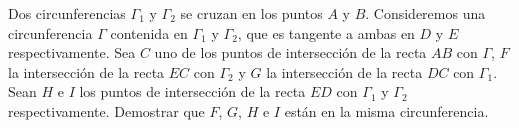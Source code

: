 Dos circunferencias $ \Gamma_1$ y $ \Gamma_2$ se cruzan en los puntos $ A$ y $ B$. Consideremos una circunferencia $ \Gamma$ contenida en $ \Gamma_1$ y $ \Gamma_2$, que es tangente a ambas en $ D$ y $ E$ respectivamente. Sea $ C$ uno de los puntos de intersección de la recta $ AB$ con $ \Gamma$, $ F$ la intersección de la recta $ EC$ con $ \Gamma_2$ y $ G$ la intersección de la recta $ DC$ con $ \Gamma_1$. Sean $ H$ e $ I$ los puntos de intersección de la recta $ ED$ con $ \Gamma_1$ y $ \Gamma_2$ respectivamente. Demostrar que $ F$, $ G$, $ H$ e $ I$ están en la misma circunferencia.
